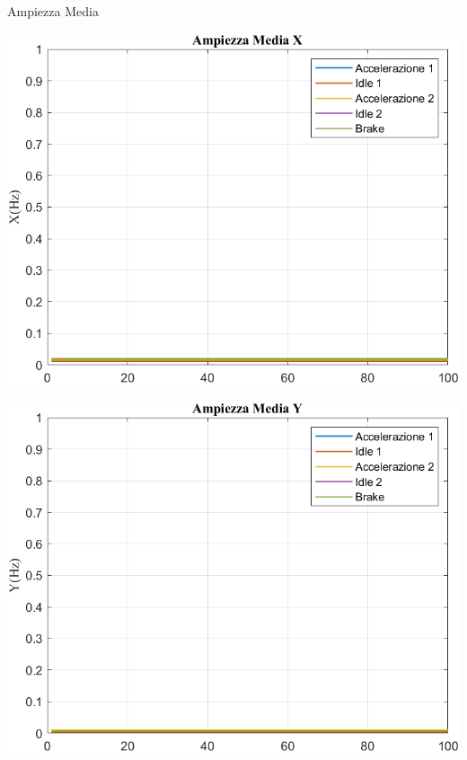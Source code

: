 \documentclass[beamer]{standalone}
\begin{document}
	\begin{frame}{{Ampiezza Media}}
		\begin{minipage}{.45\textwidth}
			\centering\includegraphics[width=.9\textwidth]{figure/Vel/Trasformata/Ampiezza MediaX}
		\end{minipage}
		\hspace{.05\textwidth}
		\begin{minipage}{.45\textwidth}
			\centering\includegraphics[width=.9\textwidth]{figure/Vel/Trasformata/Ampiezza MediaY}
		\end{minipage}
	\end{frame}
	
\end{document}
